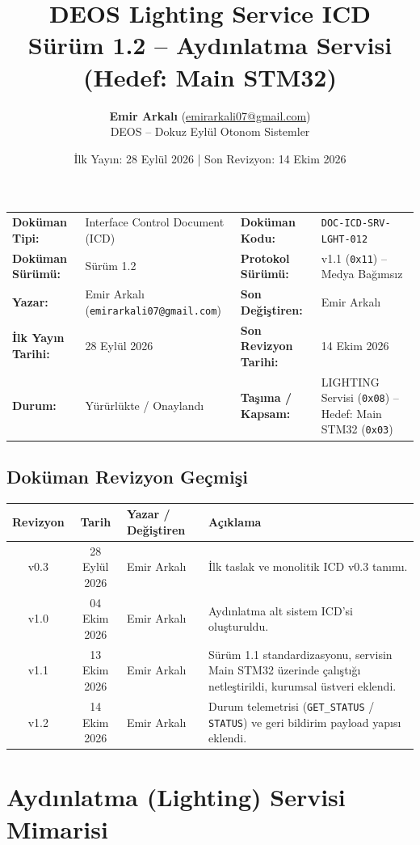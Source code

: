 \documentclass[a4paper,10pt]{article}
\title{\textbf{DEOS Lighting Service ICD}\\
\large Sürüm 1.2 -- Aydınlatma Servisi (Hedef: Main STM32)}
\author{\textbf{Emir Arkalı} (\href{mailto:emirarkali07@gmail.com}{emirarkali07@gmail.com})\\DEOS -- Dokuz Eylül Otonom Sistemler}
\date{İlk Yayın: 28 Eylül 2026 \quad | \quad Son Revizyon: 14 Ekim 2026}
\newcommand{\hex}[1]{\texttt{0x#1}}
\newcommand{\code}[1]{\texttt{#1}}
\begin{document}
\maketitle

\begin{center}
\small
\begin{tabularx}{\textwidth}{ll lX}
\toprule
\textbf{Doküman Tipi:} & Interface Control Document (ICD) & \textbf{Doküman Kodu:} & \code{DOC-ICD-SRV-LGHT-012} \\
\textbf{Doküman Sürümü:} & Sürüm 1.2 & \textbf{Protokol Sürümü:} & v1.1 (\hex{11}) -- Medya Bağımsız \\
\textbf{Yazar:} & Emir Arkalı (\texttt{emirarkali07@gmail.com}) & \textbf{Son Değiştiren:} & Emir Arkalı \\
\textbf{İlk Yayın Tarihi:} & 28 Eylül 2026 & \textbf{Son Revizyon Tarihi:} & 14 Ekim 2026 \\
\textbf{Durum:} & Yürürlükte / Onaylandı & \textbf{Taşıma / Kapsam:} & LIGHTING Servisi (\hex{08}) -- Hedef: Main STM32 (\hex{03}) \\
\bottomrule
\end{tabularx}
\end{center}

\subsection*{Doküman Revizyon Geçmişi}
\begin{center}
\small
\begin{tabularx}{\textwidth}{c c l X}
\toprule
\textbf{Revizyon} & \textbf{Tarih} & \textbf{Yazar / Değiştiren} & \textbf{Açıklama} \\
\midrule
v0.3 & 28 Eylül 2026 & Emir Arkalı & İlk taslak ve monolitik ICD v0.3 tanımı. \\
v1.0 & 04 Ekim 2026 & Emir Arkalı & Aydınlatma alt sistem ICD'si oluşturuldu. \\
v1.1 & 13 Ekim 2026 & Emir Arkalı & Sürüm 1.1 standardizasyonu, servisin Main STM32 üzerinde çalıştığı netleştirildi, kurumsal üstveri eklendi. \\
v1.2 & 14 Ekim 2026 & Emir Arkalı & Durum telemetrisi (\code{GET\_STATUS} / \code{STATUS}) ve geri bildirim payload yapısı eklendi. \\
\bottomrule
\end{tabularx}
\end{center}
\vspace{0.8em}

\section{Aydınlatma (Lighting) Servisi Mimarisi}
\end{document}
